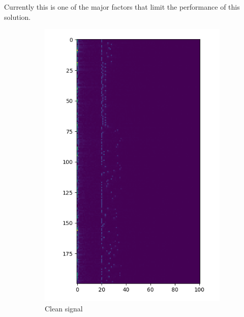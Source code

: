 \documentclass[a4paper]{article}
\begin{document}
Currently this is one of the major factors that limit the performance 
of this solution.

\begin{figure}[H]
    \centering
    \begin{subfigure}{0.45\textwidth}
        \includegraphics[width=\textwidth]{waterfall_sync_clean.png}
        \caption{\label{fig:waterfall_sync_clean}Clean signal}
    \end{subfigure}
    \begin{subfigure}{0.45\textwidth}

\end{subfigure}
\end{figure}
\end{document}
